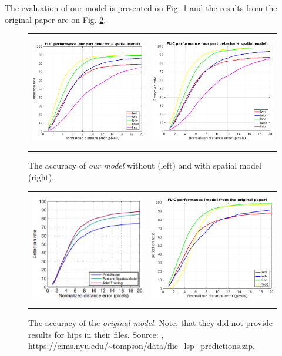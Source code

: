 \documentclass[a4paper,10pt]{article}
\begin{document}
	The evaluation of our model is presented on Fig. \ref{our_detrate} and the results from the original paper are on Fig. \ref{orig_detrate}.
	\begin{figure}[H]
		\begin{tabular}{cc}
			\includegraphics[height=5cm]{img/our_pd_detrate.png} & \includegraphics[height=5cm]{img/our_pdsm_detrate.png} 
			\caption{The accuracy of \textit{our model} without (left) and with spatial model (right).}
			\label{our_detrate}
		\end{tabular}
	\end{figure}
	\begin{figure}[H]
		\begin{tabular}{cc}
			\includegraphics[height=5cm]{img/orig_wrist_detrate.png} &
			\includegraphics[height=5cm]{img/orig_pdsm_detrate.png} 
			\caption{The accuracy of the \textit{original model}. Note, that they did not provide results for hips in their files. Source: \cite{cnn_pgm_for_hpe}, \url{https://cims.nyu.edu/~tompson/data/flic_lsp_predictions.zip}.}
			\label{orig_detrate}
		\end{tabular}
	\end{figure}
\end{document}
